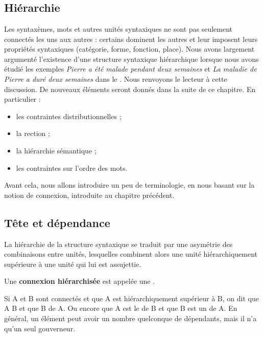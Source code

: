 \chapter{}\label{sec:3.3}

\section{Hiérarchie}\label{sec:3.3.0}

Les syntaxèmes, mots et autres unités syntaxiques ne sont pas seulement connectés les uns aux autres : certains dominent les autres et leur imposent leurs propriétés syntaxiques (catégorie, forme, fonction, place). Nous avons largement argumenté l’existence d’une structure syntaxique hiérarchique lorsque nous avons étudié les exemples \textit{Pierre a été malade pendant deux semaines} et \textit{La maladie de Pierre a duré deux semaines} dans le . Nous renvoyons le lecteur à cette discussion. De nouveaux éléments seront donnés dans la suite de ce chapitre. En particulier :

\begin{itemize}
\item les contraintes distributionnelles ;
\item la rection ;
\item la hiérarchie sémantique ;
\item les contraintes sur l’ordre des mots.
\end{itemize}

Avant cela, nous allons introduire un peu de terminologie, en nous basant sur la notion de connexion, introduite au chapitre précédent.

\section{Tête et dépendance}\label{sec:3.3.1}

La hiérarchie de la structure syntaxique se traduit par une asymétrie des combinaisons entre unités, lesquelles combinent alors une unité hiérarchiquement supérieure à une unité qui lui est assujettie.

{Une \textbf{connexion hiérarchisée} est appelée une .}

{Si A et B sont connectés et que A est hiérarchiquement supérieur à B, on dit que A  B et que B  de A. Ou encore que A est le  de B et que B est un  de A. En général, un élément peut avoir un nombre quelconque de dépendants, mais il n’a qu’un seul gouverneur.}

